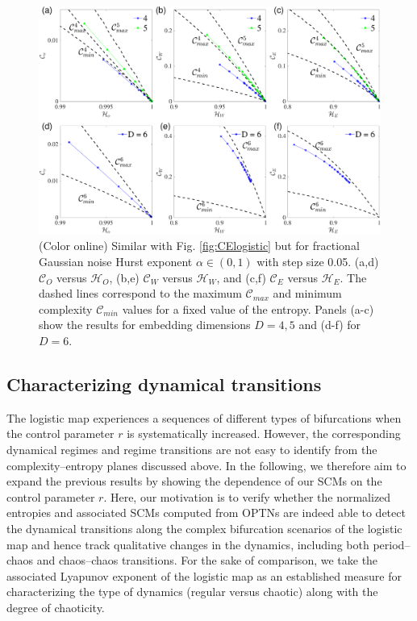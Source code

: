 \documentclass[12pt,aip,cha,reprint,nofootinbib]{revtex4-1}
\begin{document}
\begin{figure}
	\centering 
	\includegraphics[width=2\columnwidth]{CompEntropy_fGn.pdf}
\caption{\small{(Color online) Similar with Fig. \ref{fig:CElogistic} but for fractional Gaussian noise Hurst exponent $\alpha \in (0, 1)$ with step size 0.05. (a,d) $\mathcal{C}_O$ versus $\mathcal{H}_O$, (b,e) $\mathcal{C}_{W}$ versus $\mathcal{H}_{W}$, and (c,f) $\mathcal{C}_{E}$ versus $\mathcal{H}_{E}$. The dashed lines correspond to the maximum $\mathcal{C}_{max}$ and minimum complexity $\mathcal{C}_{min}$ values for a fixed value of the entropy. Panels (a-c) show the results for embedding dimensions $D = 4,5$ and (d-f) for $D = 6$.  }  \label{fig:CEfGn}}
\end{figure}


\subsection{Characterizing dynamical transitions} \label{sec:transi}
The logistic map experiences a sequences of different types of bifurcations when the control parameter $r$ is systematically increased. However, the corresponding dynamical regimes and regime transitions are not easy to identify from the complexity--entropy planes discussed above. In the following, we therefore aim to expand the previous results by showing the dependence of our SCMs on the control parameter $r$. Here, our motivation is to verify whether the normalized entropies and associated SCMs computed from OPTNs are indeed able to detect the dynamical transitions along the complex bifurcation scenarios of the logistic map and hence track qualitative changes in the dynamics, including both period--chaos and chaos--chaos transitions. For the sake of comparison, we take the associated Lyapunov exponent of the logistic map as an established measure for characterizing the type of dynamics (regular versus chaotic) along with the degree of chaoticity.
\end{document}
